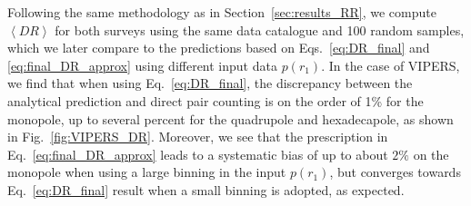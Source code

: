 \documentclass{aa}
\newcommand{\ev}[1]{\left\langle #1 \right\rangle}
\begin{document}
Following the same methodology as in Section~\ref{sec:results_RR}, we compute $\ev{DR}$ for both surveys using the same data catalogue and 100 random samples, which we later compare to the predictions based on Eqs.~\eqref{eq:DR_final} and \eqref{eq:final_DR_approx} using different input data $p(r_1)$.
In the case of VIPERS, we find that when using Eq.~\eqref{eq:DR_final}, the discrepancy between the analytical prediction and direct pair counting is on the order of 1\% for the monopole, up to several percent for the quadrupole and hexadecapole, as shown in Fig.~\ref{fig:VIPERS_DR}. Moreover, we see that the prescription in Eq.~\eqref{eq:final_DR_approx} leads to a systematic bias of up to about $2\%$ on the monopole when using a large binning in the input $p(r_1)$, but converges towards Eq.~\eqref{eq:DR_final} result when a small binning is adopted, as expected.
%
\end{document}
